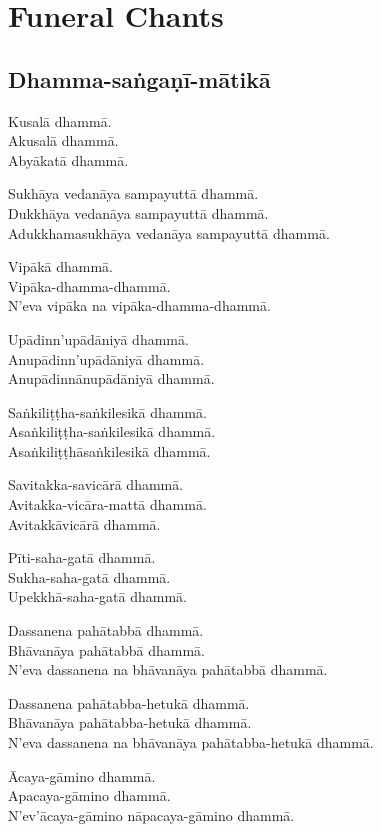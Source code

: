 \chapter{Funeral Chants}

\section{Dhamma-saṅgaṇī-mātikā}


Kusalā dhammā.\\
Akusalā dhammā.\\
Abyākatā dhammā.

Sukhāya vedanāya sampayuttā dhammā.\\
Dukkhāya vedanāya sampayuttā dhammā.\\
Adukkhamasukhāya vedanāya sampayuttā dhammā.

Vipākā dhammā.\\
Vipāka-dhamma-dhammā.\\
N'eva vipāka na vipāka-dhamma-dhammā.

Upādinn'upādāniyā dhammā.\\
Anupādinn'upādāniyā dhammā.\\
Anupādinnānupādāniyā dhammā.

Saṅkiliṭṭha-saṅkilesikā dhammā.\\
Asaṅkiliṭṭha-saṅkilesikā dhammā.\\
Asaṅkiliṭṭhāsaṅkilesikā dhammā.

\clearpage

Savitakka-savicārā dhammā.\\
Avitakka-vicāra-mattā dhammā.\\
Avitakkāvicārā dhammā.

Pīti-saha-gatā dhammā.\\
Sukha-saha-gatā dhammā.\\
Upekkhā-saha-gatā dhammā.

Dassanena pahātabbā dhammā.\\
Bhāvanāya pahātabbā dhammā.\\
N'eva dassanena na bhāvanāya pahātabbā dhammā.

Dassanena pahātabba-hetukā dhammā.\\
Bhāvanāya pahātabba-hetukā dhammā.\\
N'eva dassanena na bhāvanāya pahātabba-hetukā dhammā.

Ācaya-gāmino dhammā.\\
Apacaya-gāmino dhammā.\\
N'ev'ācaya-gāmino nāpacaya-gāmino dhammā.

